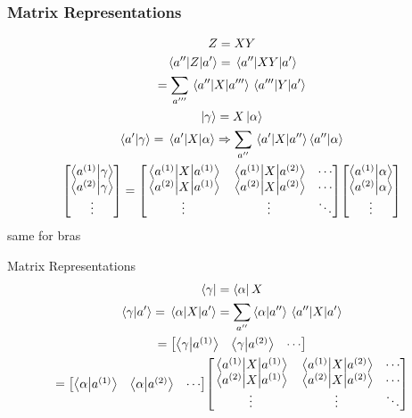 \begin{frame}
	\frametitle{Matrix Representations}

	\begin{gather*}
		Z = XY\\
		\mel{a''}{Z}{a'} = \mel{a''}{XY}{a'} \\
		= \sum_{a'''} \mel{a''}{X}{a'''} \mel{a'''}{Y}{a'}\\
		\ket{\gamma} = X \ket{\alpha}\\
		\ip{a'}{\gamma} = \mel{a'}{X}{\alpha} \Rightarrow \sum_{a''} \mel{a'}{X}{a''}\ip{a''}{\alpha} \\
		\mqty[\ip{a^{(1)}}{\gamma} \\ \ip{a^{(2)}}{\gamma} \\ \vdots] = \mqty[
			\ev{X}{a^{(1)}} & \mel{a^{(1)}}{X}{a^{(2)}} & \cdots \\
			\mel{a^{(2)}}{X}{a^{(1)}} & \ev{X}{a^{(2)}} & \cdots \\
			\vdots & \vdots & \ddots
		] \mqty[\ip{a^{(1)}}{\alpha} \\ \ip{a^{(2)}}{\alpha} \\ \vdots]
	\end{gather*}
	same for bras
\end{frame}

\begin{frame}{Matrix Representations}
	\begin{gather*}
		\bra{\gamma} = \bra{\alpha} X \\
		\ip{\gamma}{a'} = \mel{\alpha}{X}{a'} = \sum_{a''} \ip{\alpha}{a''}\mel{a'' }{X}{a'}\\
		= \mqty[\ip{\gamma}{a^{(1)}} & \ip{\gamma}{a^{(2)}} & \cdots]  \\
		= \mqty[\ip{\alpha}{a^{(1)}} & \ip{\alpha}{a^{(2)}} & \cdots]
		\mqty[
			\ev{X}{a^{(1)}} & \mel{a^{(1)}}{X}{a^{(2)}} & \cdots \\
			\mel{a^{(2)}}{X}{a^{(1)}} & \ev{X}{a^{(2)}} & \cdots \\
			\vdots & \vdots & \ddots
		]
	\end{gather*}

\end{frame}



